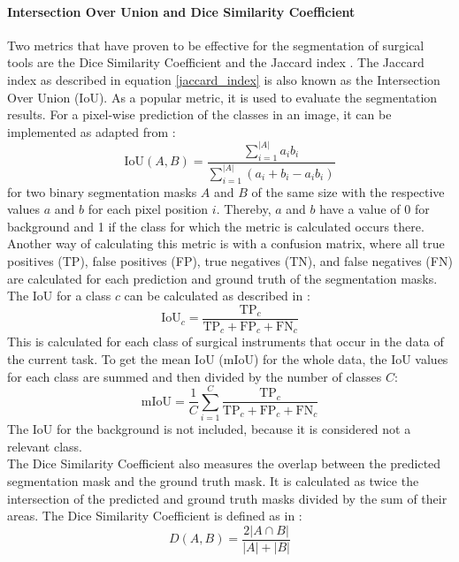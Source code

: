 \paragraph{Intersection Over Union and Dice Similarity Coefficient}
Two metrics that have proven to be effective for the segmentation of surgical tools are the Dice Similarity Coefficient and the Jaccard index \cite{leifman2022pixel}.
The Jaccard index as described in equation \ref{jaccard_index} is also known as the Intersection Over Union (IoU).
As a popular metric, it is used to evaluate the segmentation results.
For a pixel-wise prediction of the classes in an image, it can be implemented as adapted from \cite{leifman2022pixel}:
\begin{equation}
    \text{IoU}(A,B) = \frac{\sum_{i=1}^{|A|} a_i b_i}{\sum_{i=1}^{|A|} (a_i + b_i - a_i b_i)}
\end{equation}
for two binary segmentation masks $A$ and $B$ of the same size with the respective values $a$ and $b$ for each pixel position $i$.
Thereby, $a$ and $b$ have a value of 0 for background and 1 if the class for which the metric is calculated occurs there.
Another way of calculating this metric is with a confusion matrix, where all true positives (TP), false positives (FP), true negatives (TN), and false negatives (FN) are calculated for each prediction and ground truth of the segmentation masks.
The IoU for a class $c$ can be calculated as described in \cite{sulistiyo2018attribute}:
\begin{equation}
     \text{IoU}_c = \frac{\text{TP}_c}{\text{TP}_c + \text{FP}_c + \text{FN}_c}
\end{equation}
This is calculated for each class of surgical instruments that occur in the data of the current task.
To get the mean IoU (mIoU) for the whole data, the IoU values for each class are summed and then divided by the number of classes $C$:
\begin{equation}
    \text{mIoU} = \frac{1}{C}\sum_{i=1}^{C} \frac{\text{TP}_c}{\text{TP}_c + \text{FP}_c + \text{FN}_c}
\end{equation}
The IoU for the background is not included, because it is considered not a relevant class.\\
The Dice Similarity Coefficient also measures the overlap between the predicted segmentation mask and the ground truth mask.
It is calculated as twice the intersection of the predicted and ground truth masks divided by the sum of their areas.
The Dice Similarity Coefficient is defined as in \cite{leifman2022pixel}:
\begin{equation}
    D(A,B) = \frac{2|A \cap B|}{|A| + |B|}
\end{equation}
